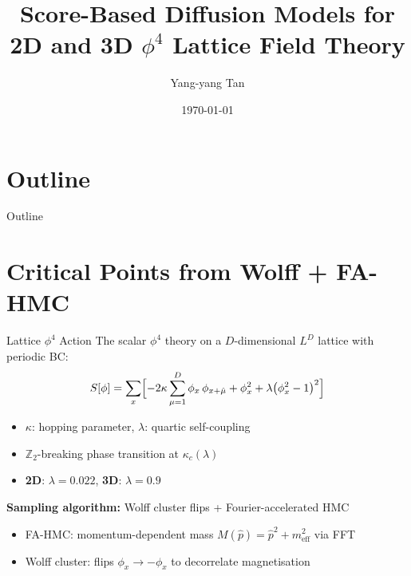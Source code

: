 \documentclass[10pt,UTF8]{beamer}
\title{Score-Based Diffusion Models for\\[4pt] 2D and 3D $\phi^4$ Lattice Field Theory}
\date{\today}
\author{Yang-yang Tan}
\begin{document}
\maketitle

{
\section{Outline}
}

\begin{frame}{Outline}
\tableofcontents
\end{frame}

\section{Critical Points from Wolff + FA-HMC}

\begin{frame}{Lattice $\phi^4$ Action}
The scalar $\phi^4$ theory on a $D$-dimensional $L^D$ lattice with periodic BC:
\begin{equation}
    S[\phi] = \sum_{x} \Bigl[
      -2\kappa \sum_{\mu=1}^{D} \phi_x\,\phi_{x+\hat\mu}
      + \phi_x^2 + \lambda\bigl(\phi_x^2 - 1\bigr)^2
    \Bigr]
\end{equation}

\begin{itemize}
    \item $\kappa$: hopping parameter, \quad $\lambda$: quartic self-coupling
    \item $\mathbb{Z}_2$-breaking phase transition at $\kappa_c(\lambda)$
    \item \textbf{2D}: $\lambda=0.022$, \quad \textbf{3D}: $\lambda=0.9$
\end{itemize}

\vspace{0.3cm}
\textbf{Sampling algorithm:} Wolff cluster flips + Fourier-accelerated HMC
\begin{itemize}
    \item FA-HMC: momentum-dependent mass $M(\hat p) = \hat p^2 + m_\text{eff}^2$ via FFT
    \item Wolff cluster: flips $\phi_x \to -\phi_x$ to decorrelate magnetisation
\end{itemize}
\end{frame}
\end{document}
